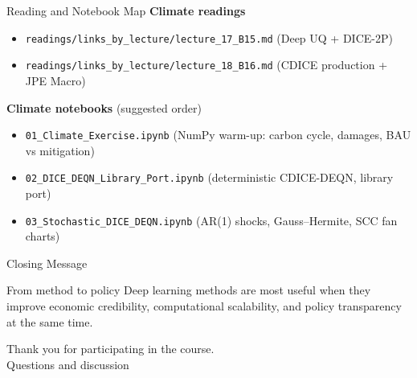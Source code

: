 \documentclass[aspectratio=169,11pt]{beamer}
\newcommand{\emphc}[1]{\textcolor{harvardcrimson}{#1}}
\begin{document}
\begin{frame}{Reading and Notebook Map}
\small
\textbf{Climate readings}
\begin{itemize}
    \item \texttt{readings/links\_by\_lecture/lecture\_17\_B15.md} \hfill (Deep UQ + DICE-2P)
    \item \texttt{readings/links\_by\_lecture/lecture\_18\_B16.md} \hfill (CDICE production + JPE Macro)
\end{itemize}

\vspace{0.2cm}
\textbf{Climate notebooks} (suggested order)
\begin{itemize}
    \item \texttt{01\_Climate\_Exercise.ipynb} \hfill (NumPy warm-up: carbon cycle, damages, BAU vs mitigation)
    \item \texttt{02\_DICE\_DEQN\_Library\_Port.ipynb} \hfill (deterministic CDICE-DEQN, library port)
    \item \texttt{03\_Stochastic\_DICE\_DEQN.ipynb} \hfill (AR(1) shocks, Gauss--Hermite, SCC fan charts)
\end{itemize}
\end{frame}

\begin{frame}{Closing Message}
\begin{block}{From method to policy}
Deep learning methods are most useful when they improve \emphc{economic credibility},
\emphc{computational scalability}, and \emphc{policy transparency} at the same time.
\end{block}

\vspace{0.5cm}
\begin{center}
{\Large Thank you for participating in the course.}\\[6pt]
{\LARGE \emphc{Questions and discussion}}
\end{center}
\end{frame}
\end{document}
